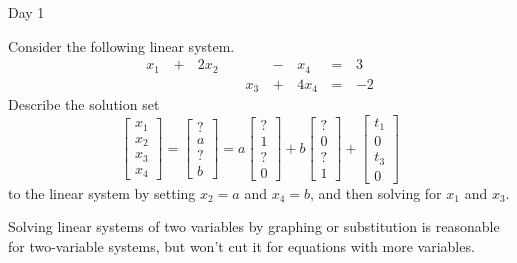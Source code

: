 \begin{applicationActivities}{Day 1}
\begin{activity}{10}
  Consider the following linear system.
  \begin{alignat*}{5}
    x_1 &\,+\,& 2x_2 &\, \,&     &\,-\,&  x_4 &\,=\,& 3 \\
        &\, \,&      &\, \,& x_3 &\,+\,& 4x_4 &\,=\,& -2
  \end{alignat*}
  Describe the solution set
  \[
    \begin{bmatrix}
      x_1 \\
      x_2 \\
      x_3 \\
      x_4
    \end{bmatrix}=
    \begin{bmatrix}
      ? \\
      a \\
      ? \\
      b
    \end{bmatrix}=
    a\begin{bmatrix}
      ? \\
      1 \\
      ? \\
      0
    \end{bmatrix}+
    b\begin{bmatrix}
      ? \\
      0 \\
      ? \\
      1
    \end{bmatrix}+
    \begin{bmatrix}
      t_1 \\
      0 \\
      t_3 \\
      0
    \end{bmatrix}
  \] to the linear system
  by setting \(x_2=a\) and \(x_4=b\), and then solving for \(x_1\) and
  \(x_3\).
\end{activity}

\begin{observation}
  Solving linear systems of two variables by graphing or substitution is
  reasonable for two-variable systems, but won't cut it for equations with
  more variables. %
\end{observation}


\end{applicationActivities}
